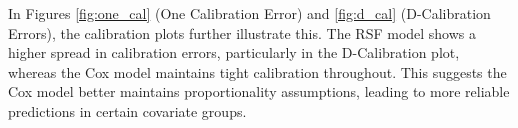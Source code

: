 \noindent In Figures \ref{fig:one_cal} (One Calibration Error) and \ref{fig:d_cal} (D-Calibration Errors), the calibration plots further illustrate this. The RSF model shows a higher spread in calibration errors, particularly in the D-Calibration plot, whereas the Cox model maintains tight calibration throughout. This suggests the Cox model better maintains proportionality assumptions, leading to more reliable predictions in certain covariate groups.


